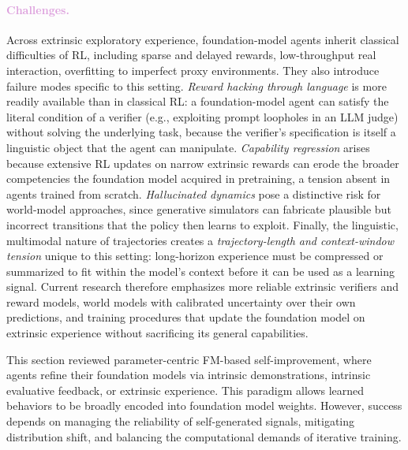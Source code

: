 \paragraph{\textcolor{Plum}{Challenges.}} Across extrinsic exploratory experience, foundation-model agents inherit classical difficulties of RL, including sparse and delayed rewards, low-throughput real interaction, overfitting to imperfect proxy environments. They also introduce failure modes specific to this setting. \textit{Reward hacking through language} is more readily available than in classical RL: a foundation-model agent can satisfy the literal condition of a verifier (e.g., exploiting prompt loopholes in an LLM judge) without solving the underlying task, because the verifier's specification is itself a linguistic object that the agent can manipulate. \textit{Capability regression} arises because extensive RL updates on narrow extrinsic rewards can erode the broader competencies the foundation model acquired in pretraining, a tension absent in agents trained from scratch. \textit{Hallucinated dynamics} pose a distinctive risk for world-model approaches, since generative simulators can fabricate plausible but incorrect transitions that the policy then learns to exploit. Finally, the linguistic, multimodal nature of trajectories creates a \textit{trajectory-length and context-window tension} unique to this setting: long-horizon experience must be compressed or summarized to fit within the model's context before it can be used as a learning signal. Current research therefore emphasizes more reliable extrinsic verifiers and reward models, world models with calibrated uncertainty over their own predictions, and training procedures that update the foundation model on extrinsic experience without sacrificing its general capabilities.

\begin{ttcolorbox}[Takeaway]
This section reviewed parameter-centric FM-based self-improvement, where agents refine their foundation models via intrinsic demonstrations, intrinsic evaluative feedback, or extrinsic experience. This paradigm allows learned behaviors to be broadly encoded into foundation model weights. However, success depends on managing the reliability of self-generated signals, mitigating distribution shift, and balancing the computational demands of iterative training.
\end{ttcolorbox}

